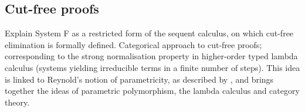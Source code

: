 \documentclass[../../Dissertation.tex]{subfiles}
\begin{document}
\subsection{Cut-free proofs}
Explain System F as a restricted form of the sequent calculus, on which cut-free elimination is formally defined.
Categorical approach to cut-free proofs; corresponding to the strong normalisation property in higher-order typed lambda calculus (systems yielding irreducible terms in a finite number of steps). This idea is linked to Reynold's notion of parametricity, as described by
, and brings together the ideas of parametric polymorphism, the lambda calculus and category theory.
\end{document}
